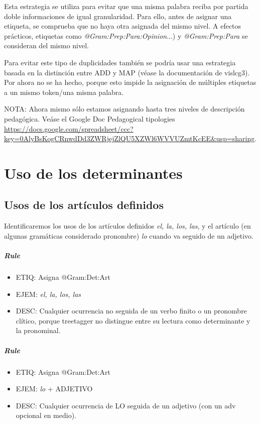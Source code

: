 \documentclass[11pt]{report}
\begin{document}
Esta estrategia se utiliza para evitar que una misma palabra reciba por partida doble informaciones de igual granularidad. Para ello, antes de asignar una etiqueta, se comprueba que no haya otra asignada del mismo nivel. A efectos prácticos, etiquetas como \emph{@Gram:Prep:Para:Opinion}...) y \emph{@Gram:Prep:Para} se consideran del mismo nivel.

Para evitar este tipo de duplicidades también se podría usar una estrategia basada en la distinción entre ADD y MAP (véase la documentación de vislcg3). Por ahora no se ha hecho, porque esto impide la asignación de múltiples etiquetas a un mismo token/una misma palabra.

NOTA: Ahora mismo sólo estamos asignando hasta tres niveles de descripción pedagógica. Veáse el Google Doc Pedagogical tipologies \url{https://docs.google.com/spreadsheet/ccc?key=0AlyBsKogCRnwdDd3ZWRjejZlQU5XZWl6WVVUZmtKcEE&usp=sharing}.

\chapter{Uso de los determinantes}
\section{Usos de los artículos definidos}
Identificaremos los usos de los artículos definidos \emph{el, la, los, las}, y el artículo (en algunas gramáticas considerado pronombre) \emph{lo} cuando va seguido de un adjetivo.

\paragraph*{Rule}
\begin{itemize}
\item ETIQ: Asigna @Gram:Det:Art
\item EJEM: \emph{el, la, los, las}
\item DESC: Cualquier ocurrencia no seguida de un verbo finito o un pronombre clítico, porque treetagger no distingue entre su lectura como determinante y la pronominal.
\end{itemize}

\paragraph*{Rule}
\begin{itemize}
\item ETIQ: Asigna @Gram:Det:Art
\item EJEM: \emph{lo} + ADJETIVO
\item DESC: Cualquier ocurrencia de LO seguida de un adjetivo (con un adv opcional en medio).
\end{itemize}
\end{document}
